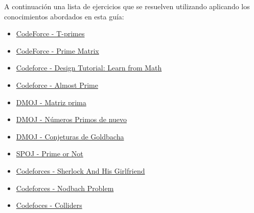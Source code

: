 A continuación una lista de ejercicios que se resuelven utilizando aplicando los conocimientos abordados en esta guía:

\begin{itemize}
	\item \href{https://codeforces.com/problemset/problem/230/B} {CodeForce - T-primes}
	\item \href{https://codeforces.com/problemset/problem/271/B}{CodeForce - Prime Matrix}
	\item \href{https://codeforces.com/problemset/problem/472/A}{Codeforce - Design Tutorial: Learn from Math}
	\item \href{https://codeforces.com/problemset/problem/26/A}{Codeforce - Almost Prime}
	\item \href{https://dmoj.uclv.edu.cu/problem/primematrix}{DMOJ - Matriz prima} 
	\item \href{https://dmoj.uclv.edu.cu/problem/primnumagain}{DMOJ - Números Primos de nuevo}
	\item \href{https://dmoj.uclv.edu.cu/problem/goldbach}{DMOJ - Conjeturas de Goldbacha} 
	\item \href{https://www.spoj.com/problems/PON/}{SPOJ - Prime or Not}
	\item \href{http://codeforces.com/contest/776/problem/B}{Codeforces - Sherlock And His Girlfriend}
    \item \href{https://codeforces.com/problemset/problem/17/A}{Codeforces - Nodbach Problem}
    \item \href{https://codeforces.com/problemset/problem/154/B}{Codefoces - Colliders}
\end{itemize}